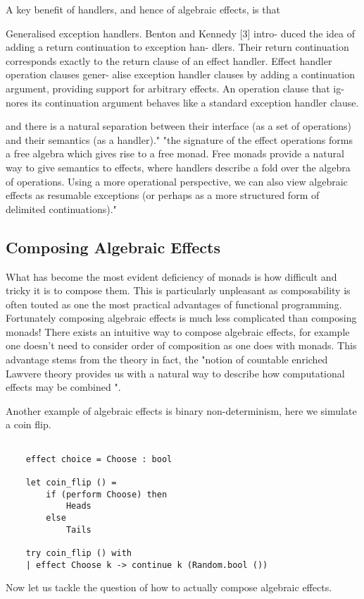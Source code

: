 A key benefit of handlers, and hence of algebraic effects,
is that

Generalised exception handlers. Benton and Kennedy [3] intro- duced the idea of adding a return continuation to exception han- dlers. Their return continuation corresponds exactly to the return clause of an effect handler. Effect handler operation clauses gener- alise exception handler clauses by adding a continuation argument, providing support for arbitrary effects. An operation clause that ig- nores its continuation argument behaves like a standard exception handler clause.

and there is a natural separation between
their interface (as a set of operations)
and
their semantics (as a handler)."
"the signature of the effect operations forms a free algebra which gives rise to a free monad.
Free monads provide a natural way to give semantics to effects,
where handlers describe a fold over the algebra of operations.
Using a more operational perspective,
we can also view algebraic effects as resumable exceptions
(or perhaps as a more structured form of delimited continuations)."
\cite{leijen2017type}

\subsection{Composing Algebraic Effects}
What has become the most evident deficiency of monads is
how difficult and tricky it is to compose them.
This is particularly unpleasant as
composability is often touted as one the most practical advantages of functional programming.
Fortunately composing algebraic effects is much less complicated than composing monads!
There exists an intuitive way to compose algebraic effects,
for example one doesn't need to consider order of composition as one does with monads.
This advantage stems from the theory in fact,
the "notion of countable enriched Lawvere theory
provides us with a natural way to describe
how computational effects may be combined
"\cite{plotkin2004computational}.

Another example of algebraic effects is binary non-determinism,
here we simulate a coin flip.\\

\begin{example}\begin{verbatim}

    effect choice = Choose : bool

    let coin_flip () =
        if (perform Choose) then
            Heads
        else
            Tails

    try coin_flip () with
    | effect Choose k -> continue k (Random.bool ())
    \end{verbatim}
\end{example}
Now let us tackle the question of how to actually compose
algebraic effects.\\

